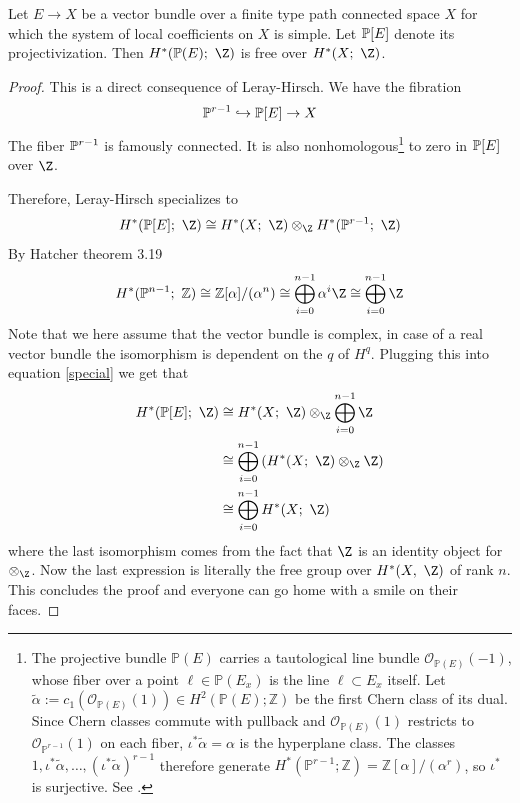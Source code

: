 \begin{theorem}
    Let $E\to X$ be a vector bundle over a finite type path connected space $X$ for which the system of local coefficients on $X$ is simple. Let   $\P[E]$ denote its projectivization. Then $H^*(\P(E);\ \Z)$ is free over $H^*(X;\ \Z)$.
\end{theorem}
\begin{proof}
    This is a direct consequence of Leray-Hirsch. We have the fibration
    \begin{equation*}
        \P^{r-1} \hookrightarrow \P[E] \to X
    \end{equation*}
   The fiber $\P^{r-1}$ is famously connected. It is also nonhomologous\footnote{The projective bundle $\mathbb{P}(E)$ carries a 
tautological line bundle $\mathcal{O}_{\mathbb{P}(E)}(-1)$, 
whose fiber over a point $\ell \in \mathbb{P}(E_x)$ is the 
line $\ell \subset E_x$ itself. Let 
$\tilde\alpha := c_1(\mathcal{O}_{\mathbb{P}(E)}(1)) \in H^2(\mathbb{P}(E); \mathbb{Z})$ 
be the first Chern class of its dual. Since Chern classes 
commute with pullback and $\mathcal{O}_{\mathbb{P}(E)}(1)$ 
restricts to $\mathcal{O}_{\mathbb{P}^{r-1}}(1)$ on each 
fiber, $\iota^*\tilde\alpha = \alpha$ is the hyperplane 
class. The classes $1, \iota^*\tilde\alpha, \ldots, 
(\iota^*\tilde\alpha)^{r-1}$ therefore generate 
$H^*(\mathbb{P}^{r-1}; \mathbb{Z}) = \mathbb{Z}[\alpha]/(\alpha^r)$, so $\iota^*$ is surjective. See \cite{Hatcher}.} to zero in $\P[E]$  over $\Z$.

   Therefore, Leray-Hirsch specializes to
   \begin{equation}\label{special}
       H^*(\P[E];\ \Z) \cong  H^*(X;\ \Z)\otimes_\Z H^*(\P^{r-1};\ \Z)
   \end{equation}
  By Hatcher \cite{Hatcher} theorem 3.19  
  \begin{equation*}
      H^*(\mathbb{P}^{n-1};\ \mathbb{Z}) \cong \mathbb{Z}[\alpha]/(\alpha^{n})\cong \bigoplus_{i=0}^{n-1}\alpha^i \Z \cong \bigoplus_{i=0}^{n-1} \Z
  \end{equation*} Note that we here assume that the vector bundle is complex, in case of a real vector bundle the isomorphism is dependent on the $q$ of $H^q$.
  Plugging this into equation \eqref{special} we get that 
  \begin{align*}
       H^*(\P[E];\ \Z) &\cong  H^*(X;\ \Z)\otimes_\Z \bigoplus_{i=0}^{n-1} \Z \\
       & \cong \bigoplus_{i=0}^{n-1}\left( H^*(X;\ \Z)\otimes_\Z  \Z\right)\\
       & \cong \bigoplus_{i=0}^{n-1} H^*(X;\ \Z)
  \end{align*}
  where the last isomorphism comes from the fact that $\Z$ is an identity object for $\otimes_\Z$. Now the last expression is literally the free group over $H^*(X, \ \Z)$ of rank $n$. This concludes the proof and everyone can go home with a smile on their faces.

    
   
\end{proof}

